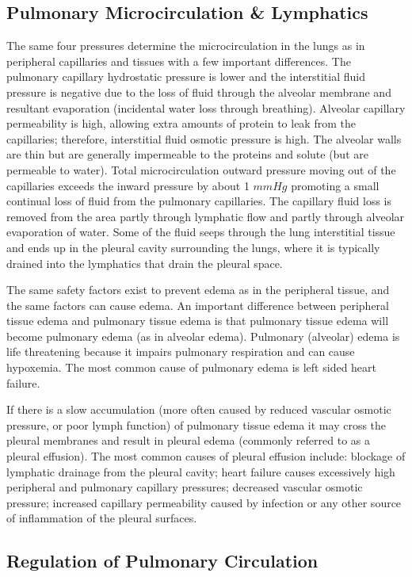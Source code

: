 \subsection{Pulmonary Microcirculation \& Lymphatics}

The same four pressures determine the microcirculation in the lungs as in peripheral capillaries and tissues with a few important differences. The pulmonary capillary hydrostatic pressure is lower and the interstitial fluid pressure is negative due to the loss of fluid through the alveolar membrane and resultant evaporation (incidental water loss through breathing). Alveolar capillary permeability is high, allowing extra amounts of protein to leak from the capillaries; therefore, interstitial fluid osmotic pressure is high. The alveolar walls are thin but are generally impermeable to the proteins and solute (but are permeable to water). Total microcirculation outward pressure moving out of the capillaries exceeds the inward pressure by about 1 $mmHg$ promoting a small continual loss of fluid from the pulmonary capillaries. The capillary fluid loss is removed from the area partly through lymphatic flow and partly through alveolar evaporation of water. Some of the fluid seeps through the lung interstitial tissue and ends up in the pleural cavity surrounding the lungs, where it is typically drained into the lymphatics that drain the pleural space.

The same safety factors exist to prevent edema as in the peripheral tissue, and the same factors can cause edema. An important difference between peripheral tissue edema and pulmonary tissue edema is that pulmonary tissue edema will become pulmonary edema (as in alveolar edema). Pulmonary (alveolar) edema is life threatening because it impairs pulmonary respiration and can cause hypoxemia. The most common cause of pulmonary edema is left sided heart failure. 

If there is a slow accumulation (more often caused by reduced vascular osmotic pressure, or poor lymph function) of pulmonary tissue edema it may cross the pleural membranes and result in pleural edema (commonly referred to as a pleural effusion). The most common causes of pleural effusion include: blockage of lymphatic drainage from the pleural cavity; heart failure causes excessively high peripheral and pulmonary capillary pressures;  decreased vascular osmotic pressure; increased capillary permeability caused by infection or any other source of inflammation of the pleural surfaces.

\subsection{Regulation of Pulmonary Circulation}

